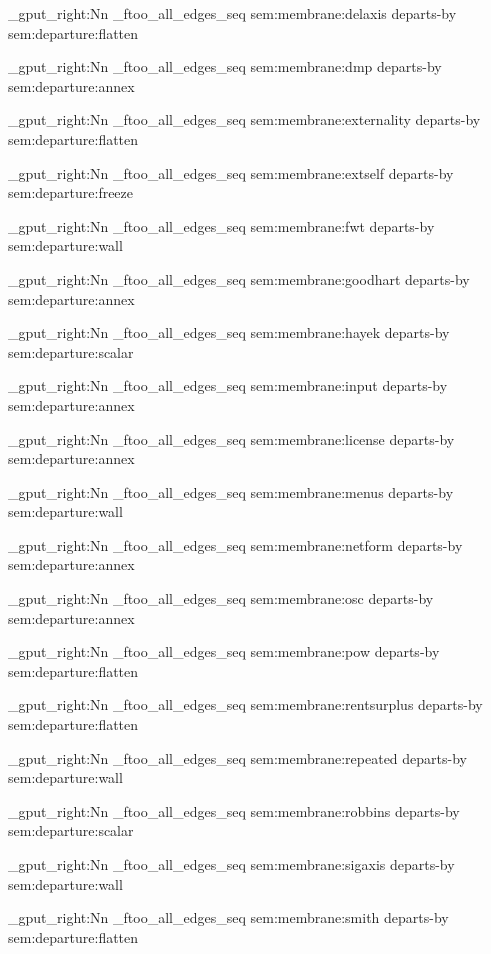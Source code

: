 \seq_gput_right:Nn \g_ftoo_all_edges_seq { { sem:membrane:delaxis } { departs-by } { sem:departure:flatten } }

\seq_gput_right:Nn \g_ftoo_all_edges_seq { { sem:membrane:dmp } { departs-by } { sem:departure:annex } }

\seq_gput_right:Nn \g_ftoo_all_edges_seq { { sem:membrane:externality } { departs-by } { sem:departure:flatten } }

\seq_gput_right:Nn \g_ftoo_all_edges_seq { { sem:membrane:extself } { departs-by } { sem:departure:freeze } }

\seq_gput_right:Nn \g_ftoo_all_edges_seq { { sem:membrane:fwt } { departs-by } { sem:departure:wall } }

\seq_gput_right:Nn \g_ftoo_all_edges_seq { { sem:membrane:goodhart } { departs-by } { sem:departure:annex } }

\seq_gput_right:Nn \g_ftoo_all_edges_seq { { sem:membrane:hayek } { departs-by } { sem:departure:scalar } }

\seq_gput_right:Nn \g_ftoo_all_edges_seq { { sem:membrane:input } { departs-by } { sem:departure:annex } }

\seq_gput_right:Nn \g_ftoo_all_edges_seq { { sem:membrane:license } { departs-by } { sem:departure:annex } }

\seq_gput_right:Nn \g_ftoo_all_edges_seq { { sem:membrane:menus } { departs-by } { sem:departure:wall } }

\seq_gput_right:Nn \g_ftoo_all_edges_seq { { sem:membrane:netform } { departs-by } { sem:departure:annex } }

\seq_gput_right:Nn \g_ftoo_all_edges_seq { { sem:membrane:osc } { departs-by } { sem:departure:annex } }

\seq_gput_right:Nn \g_ftoo_all_edges_seq { { sem:membrane:pow } { departs-by } { sem:departure:flatten } }

\seq_gput_right:Nn \g_ftoo_all_edges_seq { { sem:membrane:rentsurplus } { departs-by } { sem:departure:flatten } }

\seq_gput_right:Nn \g_ftoo_all_edges_seq { { sem:membrane:repeated } { departs-by } { sem:departure:wall } }

\seq_gput_right:Nn \g_ftoo_all_edges_seq { { sem:membrane:robbins } { departs-by } { sem:departure:scalar } }

\seq_gput_right:Nn \g_ftoo_all_edges_seq { { sem:membrane:sigaxis } { departs-by } { sem:departure:wall } }

\seq_gput_right:Nn \g_ftoo_all_edges_seq { { sem:membrane:smith } { departs-by } { sem:departure:flatten } }

